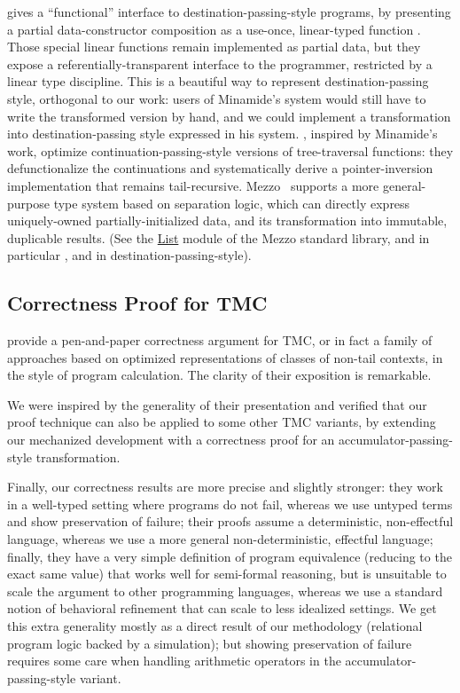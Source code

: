 \citet*{minamide-98} gives a ``functional'' interface to destination-passing-style programs, by presenting a partial data-constructor composition  as a use-once, linear-typed function .
Those special linear functions remain implemented as partial data, but they expose a referentially-transparent interface to the programmer, restricted by a linear type discipline.
This is a beautiful way to represent destination-passing style, orthogonal to our work: users of Minamide's system would still have to write the transformed version by hand, and we could implement a transformation into destination-passing style expressed in his system.
\citet*{sobel-friedman-98}, inspired by Minamide's work, optimize continuation-passing-style versions of tree-traversal functions: they defunctionalize the continuations and systematically derive a pointer-inversion implementation that remains tail-recursive.
Mezzo~\citep*{mezzo-2016} supports a more general-purpose type system based on separation logic, which can directly express uniquely-owned partially-initialized data, and its transformation into immutable, duplicable results.
(See the \href{https://protz.github.io/mezzo/code_samples/list.mz.html}{List} module of the Mezzo standard library, and in particular ,  and  in destination-passing-style).

\subsection{Correctness Proof for TMC}

\citet*{tmc-koka-2023} provide a pen-and-paper correctness argument for TMC, or in fact a family of approaches based on optimized representations of classes of non-tail contexts, in the style of program calculation.
The clarity of their exposition is remarkable.

We were inspired by the generality of their presentation and verified that our proof technique can also be applied to some other TMC variants, by extending our mechanized development with a correctness proof for an
accumulator-passing-style transformation.

Finally, our correctness results are more precise and slightly stronger: they work in a well-typed setting where programs do not fail, whereas we use untyped terms and show preservation of failure; their proofs assume a deterministic, non-effectful language, whereas we use a more general non-deterministic, effectful language; finally, they have a very simple definition of program equivalence (reducing to the exact same value) that works well for semi-formal reasoning, but is unsuitable to scale the argument to other programming languages, whereas we use a standard notion of behavioral refinement that can scale to less idealized settings.
%
We get this extra generality mostly as a direct result of our methodology (relational program logic backed by a simulation); but showing preservation of failure requires some care when handling arithmetic operators in the accumulator-passing-style variant.

